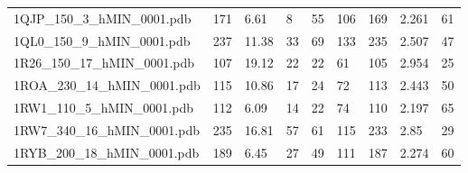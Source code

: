 \documentclass{bioinfo}
\begin{document}
\begin{table}[!t]
{\begin{tabular}{lllllllll}
    1QJP\_150\_3\_hMIN\_0001.pdb & 171      & 6.61       & 8           & 55          & 106         & 169     & 2.261           & 61           \\
    1QL0\_150\_9\_hMIN\_0001.pdb & 237      & 11.38      & 33          & 69          & 133         & 235     & 2.507           & 47           \\
    1R26\_150\_17\_hMIN\_0001.pdb & 107      & 19.12      & 22          & 22          & 61          & 105     & 2.954           & 25           \\
    1ROA\_230\_14\_hMIN\_0001.pdb & 115      & 10.86      & 17          & 24          & 72          & 113     & 2.443           & 50           \\
    1RW1\_110\_5\_hMIN\_0001.pdb & 112      & 6.09       & 14          & 22          & 74          & 110     & 2.197           & 65           \\
    1RW7\_340\_16\_hMIN\_0001.pdb & 235      & 16.81      & 57          & 61          & 115         & 233     & 2.85            & 29           \\
    1RYB\_200\_18\_hMIN\_0001.pdb & 189      & 6.45       & 27          & 49          & 111         & 187     & 2.274           & 60           \\
\end{tabular}}{}
\end{table}
\end{document}
